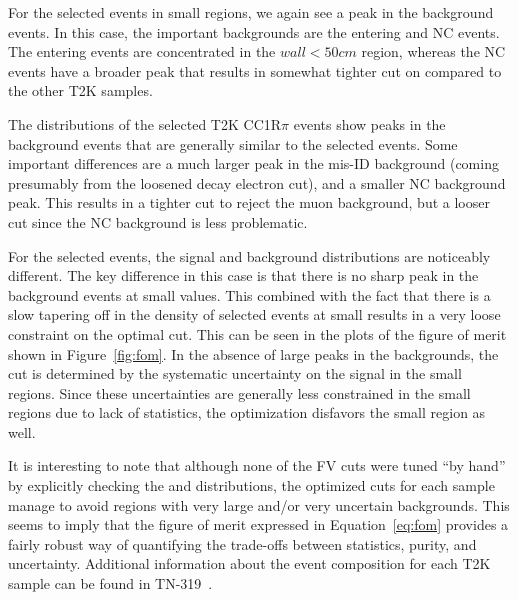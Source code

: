 For the selected \nue events in small \wall regions, we again see a peak in the
background events.  In this case, the important backgrounds are the entering and
NC events. The entering events are concentrated in the $wall < 50 cm$ region,
whereas the NC events have a broader peak that results in somewhat tighter cut
on \wall compared to the other T2K samples.

The distributions of the selected T2K \nue CC1R$\pi$ events show peaks in the
background events that are generally similar to the selected \nue events.  Some
important differences are a much larger peak in the mis-ID background (coming
presumably from the loosened decay electron cut), and a smaller NC background
peak.  This results in a tighter \towall cut to reject the muon background, but
a looser \wall cut since the NC background is less problematic.

For the selected \numu events, the signal and background distributions are
noticeably different.  The key difference in this case is that there is no
sharp peak in the background events at small \towall values.  This combined
with the fact that there is a slow tapering off in the density of selected
\numu events at small \towall results in a very loose constraint on the optimal
\towall cut.  This can be seen in the plots of the figure of merit shown in
Figure~\ref{fig:fom}.  In the absence of large peaks in the backgrounds, the
\numu \towall cut is determined by the systematic uncertainty on the signal in
the small \towall regions.  Since these uncertainties are generally less
constrained in the small \towall regions due to lack of statistics, the optimization disfavors
the small \towall region as well.

It is interesting to note that although none of the FV cuts were tuned ``by
hand'' by explicitly checking the \towall and \wall distributions, the
optimized cuts for each sample manage to avoid regions with very large and/or
very uncertain backgrounds.  This seems to imply that the figure of merit
expressed in Equation~\ref{eq:fom} provides a fairly robust way of quantifying
the trade-offs between statistics, purity, and uncertainty.  Additional
information about the event composition for each T2K sample can be found in
TN-319~\cite{tn319}.

\FloatBarrier

